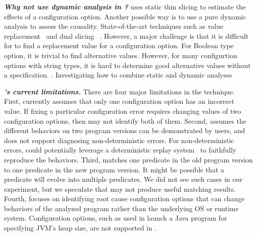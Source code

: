 
\vspace{1mm}
\noindent \textbf{\textit{Why not use dynamic analysis in \ourtool?}}
\ourtool uses static thin slicing to estimate the effects of
a configuration option. Another possible way is to use a pure
dynamic analysis to assess the causality. State-of-the-art
techniques such as value replacement~\cite{} and dual slicing~\cite{}
.
However, a major challenge is that it is difficult for
\ourtool to find a replacement value for a configuration option.
For Boolean type option, it is trivial to find alternative values.
However, for many configurtion options with string types, it
is hard to determine good alternative values without a specification.
. Investigating how
to combine static and dynamic analyses 


\vspace{1mm}
\noindent \textbf{\textit{\ourtool's current limitations.}}
There are four major limitations in the \ourtool technique.
First, \ourtool currently assumes that only one
configuration option has an incorrect value.
If fixing a particular configuration error
requires changing values of two configuration options,
then \ourtool may not identify both of them.
Second, \ourtool assumes the different behaviors
on two program versions can be demonstrated by users,
and does not support diagnosing non-deterministic
errors. For non-deterministic errors, \ourtool
could potentially leverage a deterministic replay
system~\cite{Huang:2013:CRL, Jin:2012:BRF} to faithfully reproduce the behaviors.
Third, \ourtool matches one predicate in the old
program version to one predicate in the new program version.
It might be possible that a predicate will evolve
into multiple predicates. We did not see such cases
in our experiment, but we speculate that \ourtool
may not produce useful matching results.
Fourth, \ourtool focuses on identifying root cause
configuration options that can change behaviors of
the analyzed program rather than the underlying OS
or runtime system. Configuration options, such
as  used in launch a Java program for
specifying JVM's heap size, are not supported
in \ourtool.
